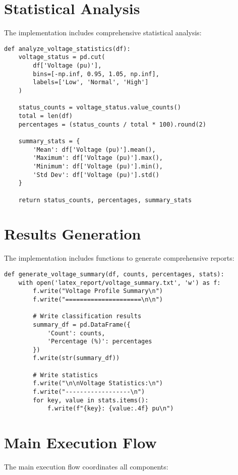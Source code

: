 \documentclass[11pt]{article}
\begin{document}
\section{Statistical Analysis}
The implementation includes comprehensive statistical analysis:

\begin{lstlisting}[caption=Statistical Analysis Implementation]
def analyze_voltage_statistics(df):
    voltage_status = pd.cut(
        df['Voltage (pu)'],
        bins=[-np.inf, 0.95, 1.05, np.inf],
        labels=['Low', 'Normal', 'High']
    )
    
    status_counts = voltage_status.value_counts()
    total = len(df)
    percentages = (status_counts / total * 100).round(2)
    
    summary_stats = {
        'Mean': df['Voltage (pu)'].mean(),
        'Maximum': df['Voltage (pu)'].max(),
        'Minimum': df['Voltage (pu)'].min(),
        'Std Dev': df['Voltage (pu)'].std()
    }
    
    return status_counts, percentages, summary_stats
\end{lstlisting}

\section{Results Generation}
The implementation includes functions to generate comprehensive reports:

\begin{lstlisting}[caption=Results Generation]
def generate_voltage_summary(df, counts, percentages, stats):
    with open('latex_report/voltage_summary.txt', 'w') as f:
        f.write("Voltage Profile Summary\n")
        f.write("=====================\n\n")
        
        # Write classification results
        summary_df = pd.DataFrame({
            'Count': counts,
            'Percentage (%)': percentages
        })
        f.write(str(summary_df))
        
        # Write statistics
        f.write("\n\nVoltage Statistics:\n")
        f.write("------------------\n")
        for key, value in stats.items():
            f.write(f"{key}: {value:.4f} pu\n")
\end{lstlisting}

\section{Main Execution Flow}
The main execution flow coordinates all components:
\end{document}
